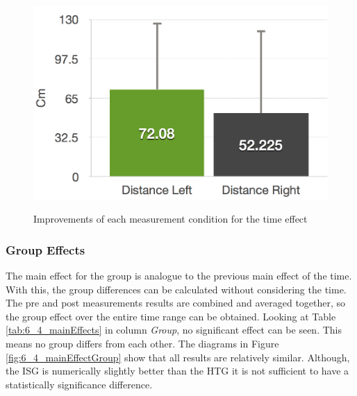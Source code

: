 \begin{figure}[htb]
		\hfill
	\begin{minipage}[t]{0.32\linewidth}
		\centering
		\includegraphics[width=1\linewidth]{Pictures/6_4_DIA_DistanceAllDiff}
		\label{fig:6_4_distanceAllDiff}
	\end{minipage}
	\caption{Improvements of each measurement condition for the time effect}
	\label{fig:6_4_timeImprovement}
\end{figure}

\subsubsection{Group Effects}
The main effect for the group is analogue to the previous main effect of the time.
With this, the group differences can be calculated without considering the time.
The pre and post measurements results are combined and averaged together, so the group effect over the entire time range can be obtained.
Looking at Table \ref{tab:6_4_mainEffects} in column \textit{Group}, no significant effect can be seen.
This means no group differs from each other.
The diagrams in Figure \ref{fig:6_4_mainEffectGroup} show that all results are relatively similar.
Although, the ISG is numerically slightly better than the HTG it is not sufficient to have a statistically significance difference.

